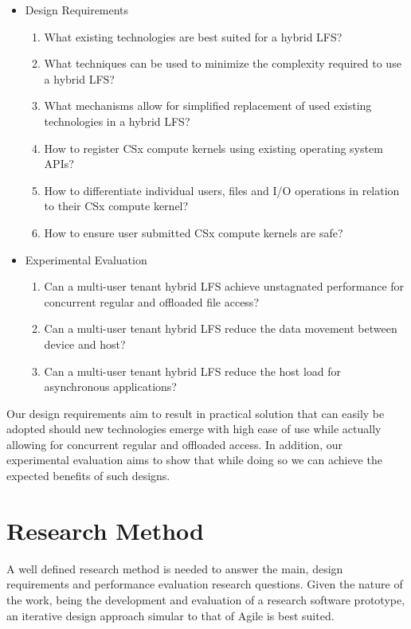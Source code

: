 \begin{itemize}
    \item Design Requirements
    \begin{enumerate}
        \item What existing technologies are best suited for a hybrid LFS?
        \item What techniques can be used to minimize the complexity required to
              use a hybrid LFS?
        \item What mechanisms allow for simplified replacement of used existing
              technologies in a hybrid LFS?
        \item How to register CSx compute kernels using existing operating 
              system APIs?
        \item How to differentiate individual users, files and I/O operations in
              relation to their CSx compute kernel?
        \item How to ensure user submitted CSx compute kernels are safe?
    \end{enumerate}
    \item Experimental Evaluation
    \begin{enumerate}
        \item Can a multi-user tenant hybrid LFS achieve unstagnated performance
              for concurrent regular and offloaded file access?
        \item Can a multi-user tenant hybrid LFS reduce the data movement
              between device and host?
        \item Can a multi-user tenant hybrid LFS reduce the host load for
              asynchronous applications?
    \end{enumerate}
\end{itemize}

Our design requirements aim to result in practical solution that can easily be
adopted should new technologies emerge with high ease of use while actually
allowing for concurrent regular and offloaded access. In addition, our
experimental evaluation aims to show that while doing so we can achieve the
expected benefits of such designs.

\section{Research Method}

A well defined research method is needed to answer the main, design requirements
and performance evaluation research questions. Given the nature of the work,
being the development and evaluation of a research software prototype, an
iterative design approach simular to that of Agile is best suited.

